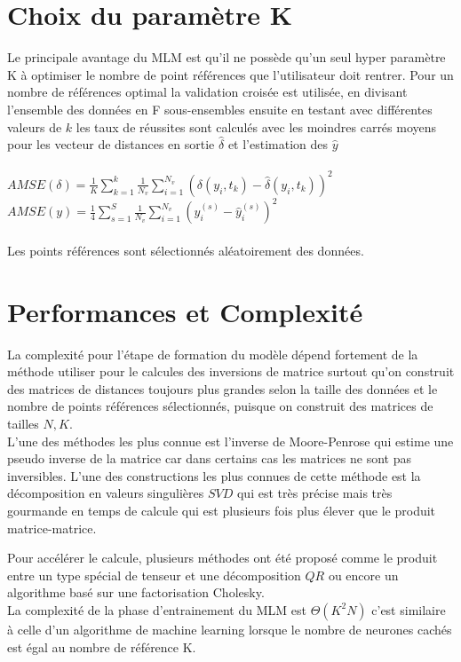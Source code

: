 \documentclass[12pt,a4paper]{report}
\begin{document}
\section{Choix du paramètre K}
\par Le principale avantage du MLM est qu'il ne possède qu'un seul hyper paramètre K à optimiser le nombre de point références que l'utilisateur doit rentrer. Pour un nombre de références optimal la validation croisée est utilisée, en divisant l'ensemble des données en F sous-ensembles ensuite en testant avec différentes valeurs de $k$ les taux de réussites sont calculés avec les moindres carrés moyens pour les vecteur de distances en sortie $\hat{\delta}$ et l'estimation des $\hat{y}$\\ \\
$AMSE(\delta) = \frac{1}{K} \sum_{k=1}^k \frac{1}{N_v} \sum_{i=1}^{N_v} (\delta(y_i,t_k) - \hat{\delta}(y_i,t_k))^2$ \\
$AMSE(y)=\frac{1}{4} \sum_{s = 1}^S \frac{1}{N_v} \sum_{i = 1}^{N_v} (y_i^{(s)} -\hat{y}_i^{(s)})^2$\\\\
Les points références sont sélectionnés aléatoirement des données. 

\section{Performances et Complexité}
\par La complexité pour l'étape de formation du modèle  dépend fortement de la méthode utiliser pour le calcules des inversions de matrice surtout qu'on construit des matrices de distances toujours plus grandes selon la taille des données et le nombre de points références sélectionnés, puisque on construit des matrices de tailles $N,K$.\\
L'une des méthodes les plus connue est l'inverse de Moore-Penrose qui estime une pseudo inverse de la matrice car dans certains cas les matrices ne sont pas inversibles. L'une des constructions les plus connues de cette méthode est la décomposition en valeurs singulières $SVD$ qui est très précise mais très gourmande en temps de calcule qui est plusieurs fois plus élever que le produit matrice-matrice.\\
\par Pour accélérer le calcule, plusieurs méthodes ont été proposé comme le produit entre un type spécial de tenseur et une décomposition $QR$ ou encore un algorithme basé sur une factorisation Cholesky.\\
La complexité de la phase d'entrainement du MLM est $\Theta (K^2N)$ c'est similaire à celle d'un algorithme de machine learning lorsque le nombre de neurones cachés est égal au nombre de référence K.
\end{document}
